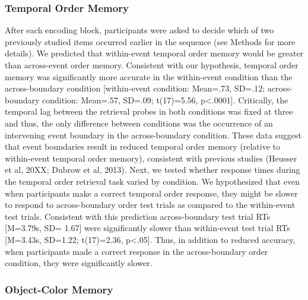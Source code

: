 \subsubsection{Temporal Order Memory}\label{temporal-order-memory}

After each encoding block, participants were asked to decide which of
two previously studied items occurred earlier in the sequence (see
Methods for more details). We predicted that within-event temporal order
memory would be greater than across-event order memory. Consistent with
our hypothesis, temporal order memory was significantly more accurate in
the within-event condition than the across-boundary condition
{[}within-event condition: Mean=.73, SD=.12; across-boundary condition:
Mean=.57, SD=.09; t(17)=5.56, p\textless{}.0001{]}. Critically, the
temporal lag between the retrieval probes in both conditions was fixed
at three and thus, the only difference between conditions was the
occurrence of an intervening event boundary in the across-boundary
condition. These data suggest that event boundaries result in reduced
temporal order memory (relative to within-event temporal order memory),
consistent with previous studies (Heusser et al, 20XX; Dubrow et al,
2013). Next, we tested whether response times during the temporal order
retrieval task varied by condition. We hypothesized that even when
participants make a correct temporal order response, they might be
slower to respond to across-boundary order test trials as compared to
the within-event test trials. Consistent with this prediction
across-boundary test trial RTs {[}M=3.79s, SD= 1.67{]} were
significantly slower than within-event test trial RTs {[}M=3.43s,
SD=1.22; t(17)=2.36, p\textless{}.05{]}. Thus, in addition to reduced
accuracy, when participants made a correct response in the
across-boundary order condition, they were significantly slower.

\subsubsection{Object-Color Memory}\label{object-color-memory}

